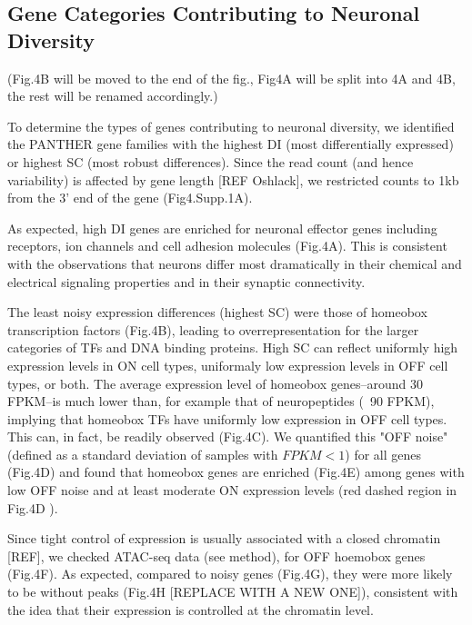 \subsection{Gene Categories Contributing to Neuronal Diversity}

(Fig.4B will be moved to the end of the fig., Fig4A will be split into 4A and 4B, the rest will be renamed accordingly.)

To determine the types of genes contributing to neuronal diversity, we identified the PANTHER gene families with the highest DI (most differentially expressed) or highest SC (most robust differences). Since the read count (and hence variability) is affected by gene length [REF Oshlack], we restricted counts to 1kb from the 3' end of the gene (Fig4.Supp.1A). 

As expected, high DI genes are enriched for neuronal effector genes including receptors, ion channels and cell adhesion molecules (Fig.4A). This is consistent with the observations that neurons differ most dramatically in their chemical and electrical signaling properties and in their synaptic connectivity.

The least noisy expression differences (highest SC) were those of homeobox transcription factors (Fig.4B), leading to overrepresentation for the larger categories of TFs and DNA binding proteins. High SC can reflect uniformly high expression levels in ON cell types, uniformaly low expression levels in OFF cell types, or both. The average expression level of homeobox genes--around 30 FPKM--is much lower than, for example that of  neuropeptides (~90 FPKM), implying that homeobox TFs have uniformly low expression in OFF cell types. This can, in fact, be readily observed (Fig.4C). We quantified this "OFF noise" (defined as a standard deviation of samples with $FPKM<1$) for all genes (Fig.4D) and found that homeobox genes are enriched (Fig.4E) among genes with low OFF noise and at least moderate ON expression levels (red dashed region in Fig.4D ).

Since tight control of expression is usually associated with a closed chromatin [REF], we checked ATAC-seq data (see method), for OFF hoemobox genes (Fig.4F). As expected, compared to noisy genes (Fig.4G), they were more likely to be without peaks (Fig.4H [REPLACE WITH A NEW ONE]), consistent with the idea that their expression is controlled at the chromatin level.

